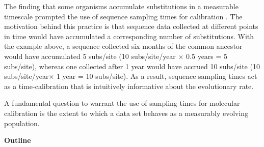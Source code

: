 \documentclass[11pt]{article}
\begin{document}
The finding that some organisms accumulate substitutions in a measurable timescale prompted the use of sequence sampling times for calibration \citep{drummond2003measurably}. The motivation behind this practice is that sequence data collected at different points in time would have accumulated a corresponding number of substitutions. With the example above, a sequence collected six months of the common ancestor would have accumulated 5 subs/site (10 subs/site/year $\times$ 0.5 years = 5 subs/site), whereas one collected after 1 year would have accrued 10 subs/site (10 subs/site/year$\times$ 1 year = 10 subs/site). As a result, sequence sampling times act as a time-calibration that is intuitively informative about the evolutionary rate.

A fundamental question to warrant the use of sampling times for molecular calibration is the extent to which a data set behaves as a measurably evolving population. 

\textbf{Outline}
\end{document}
